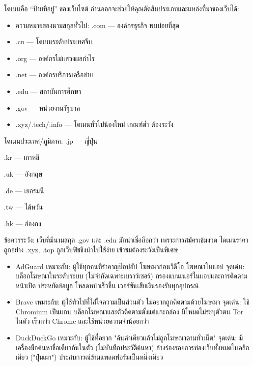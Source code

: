 
โดเมนคือ “ป้ายที่อยู่” ของเว็บไซต์ อ่านออกจะช่วยให้คุณตัดสินประเภทและแหล่งที่มาของเว็บได้:

\begin{itemize}
  \item ความหมายของนามสกุลทั่วไป: .com — องค์กรธุรกิจ พบบ่อยที่สุด
  \item .cn — โดเมนระดับประเทศจีน
  \item .org — องค์กรไม่แสวงผลกำไร
  \item .net — องค์กรบริการเครือข่าย
  \item .edu — สถาบันการศึกษา
  \item .gov — หน่วยงานรัฐบาล
  \item .xyz/.tech/.info — โดเมนทั่วไปน้องใหม่ เกณฑ์ต่ำ ต้องระวัง
\end{itemize}

โดเมนประเทศ/ภูมิภาค: .jp — ญี่ปุ่น

.kr — เกาหลี

.uk — อังกฤษ

.de — เยอรมนี

.tw — ไต้หวัน

.hk — ฮ่องกง

ข้อควรระวัง: เว็บที่มีนามสกุล .gov และ .edu มักน่าเชื่อถือกว่า เพราะการสมัครเข้มงวด โดเมนราคาถูกอย่าง .xyz, .top ถูกเว็บฟิชชิงนำไปใช้ง่าย เข้าชมต้องระวังเป็นพิเศษ


\begin{itemize}
  \item AdGuard เหมาะกับ: ผู้ใช้ทุกคนที่รำคาญป๊อปอัป โฆษณาก่อนวิดีโอ โฆษณาในแอป จุดเด่น: บล็อกโฆษณาในระดับระบบ (ไม่จำกัดเฉพาะเบราว์เซอร์) กรองแบนเนอร์ในแอปและการติดตามหน้าเปิด ประหยัดข้อมูล โหลดหน้าเร็วขึ้น เวอร์ชันเสียเงินรองรับทุกอุปกรณ์
\end{itemize}


\begin{itemize}
  \item Brave เหมาะกับ: ผู้ใช้ทั่วไปที่ใส่ใจความเป็นส่วนตัว ไม่อยากถูกติดตามด้วยโฆษณา จุดเด่น: ใช้ Chromium เป็นแกน บล็อกโฆษณาและตัวติดตามตั้งแต่แกะกล่อง มีโหมดไม่ระบุตัวตน Tor ในตัว เร็วกว่า Chrome และใช้หน่วยความจำน้อยกว่า
  \item DuckDuckGo เหมาะกับ: ผู้ใช้ที่อยาก "ค้นคำเดียวแล้วไม่ถูกโฆษณาตามทั่วเน็ต" จุดเด่น: มีเครื่องมือค้นหาชื่อเดียวกันในตัว (ไม่บันทึกประวัติค้นหา) ล้างร่องรอยการท่องเว็บทั้งหมดในคลิกเดียว ("ปุ่มเผา") ประสบการณ์ข้ามแพลตฟอร์มเป็นหนึ่งเดียว
\end{itemize}

